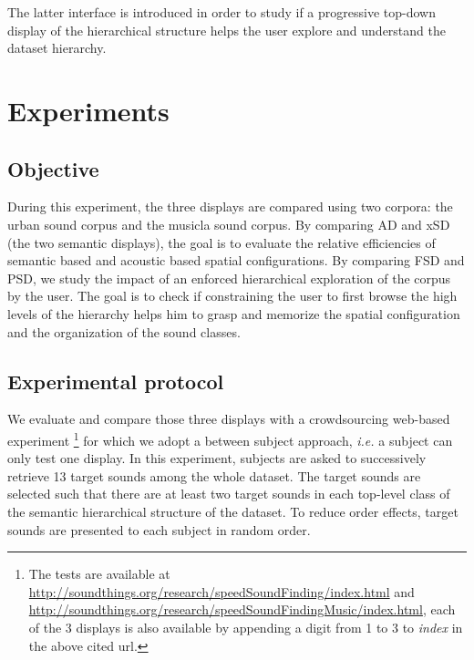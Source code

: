 \documentclass{aes2e}
\begin{document}
The latter interface is introduced in order to study if a progressive top-down display of the hierarchical structure helps the user explore and understand the dataset hierarchy.

%

\section{Experiments} \label{test}

\subsection{Objective}

During this experiment, the three displays are compared using two corpora: the urban sound corpus and the musicla sound corpus. By comparing AD and xSD (the two semantic displays), the goal is to evaluate the  relative efficiencies of semantic based and acoustic based spatial configurations. By comparing FSD and PSD, we study the impact of an enforced hierarchical exploration of the corpus by the user. The goal is to check if constraining the user to first browse the high levels of the hierarchy helps him to grasp and memorize the spatial configuration and the organization of the sound classes. 

\subsection{Experimental protocol}

We evaluate and compare those three displays with a crowdsourcing web-based experiment \footnote{The tests are available at \url{http://soundthings.org/research/speedSoundFinding/index.html} and \url{http://soundthings.org/research/speedSoundFindingMusic/index.html}, each of the 3 displays is also available by appending a digit from 1 to 3 to \textit{index} in the above cited url.} for which we adopt a between subject approach, \textit{i.e.} a subject can only test one display. In this experiment, subjects are asked to successively retrieve 13 target sounds among the whole dataset. The target sounds are selected such that there are at least two target sounds in each top-level class of the semantic hierarchical structure of the dataset. To reduce order effects, target sounds are presented to each subject in random order.
\end{document}

